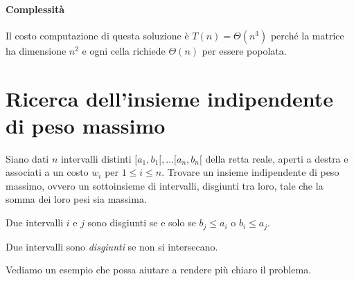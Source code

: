 \paragraph{Complessità}
Il costo computazione di questa soluzione è $T(n)=\Theta(n^3)$ perché la matrice
ha dimensione $n^2$ e ogni cella richiede $\Theta(n)$ per essere popolata.

\section{Ricerca dell'insieme indipendente di peso massimo}
\begin{problem}
    Siano dati $n$ intervalli distinti $[a_1,b_1[,\dots[a_n,b_n[$ della retta
    reale, aperti a destra e associati a un costo $w_i$ per $1\leq i\leq n$.
    Trovare un insieme indipendente di peso massimo, ovvero un sottoinsieme di
    intervalli, disgiunti tra loro, tale che la somma dei loro pesi sia massima.
\end{problem}
\begin{definition}
    Due intervalli $i$ e $j$ sono disgiunti se e solo se $b_j\leq a_i$ o
    $b_i\leq a_j$.
\end{definition}
\begin{note}
    Due intervalli sono \emph{disgiunti} se non si intersecano.
\end{note}\noindent
Vediamo un esempio che possa aiutare a rendere più chiaro il problema.  

